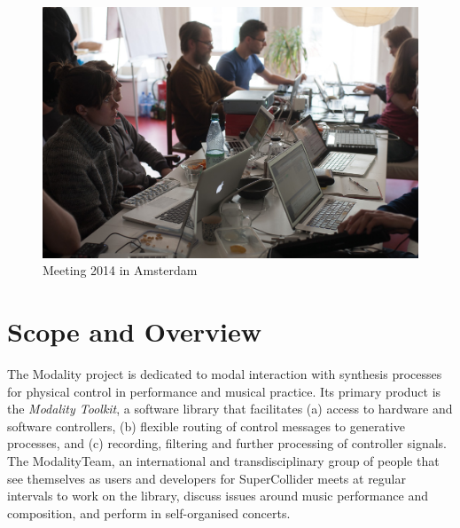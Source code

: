 \documentclass{article}
\title{\papertitle}
\begin{document}
%
\capstartfalse
\maketitle
\capstarttrue
%
\begin{abstract}
The Modality Toolkit aims to improve and facilitate the use of digital technology within interactive sound art and music. 
Written in SuperCollider, it simplifies the creation of individual electronic instruments by combining custom sound engines with off-the-shelf controllers. 
To this end, a common code interface, |MKtl|, is used to connect controllers from various sources and protocols. 
Currently, HID and MIDI are supported; GUI-based interfaces can be created on the fly from interface descriptions.
\end{abstract}

\begin{figure}[h]
	\centering
		\includegraphics[width=.9\columnwidth]{../media/20140331-IMG_5976.jpg}
	\caption{Meeting 2014 in Amsterdam}
	\label{fig:media_20140331-IMG_5976}
\end{figure}

\section{Scope and Overview}
\label{sec:overview_of_modality_concept_and_aims}

The Modality project is dedicated to modal interaction with synthesis processes for physical control in performance and musical practice.
Its primary product is the \emph{Modality Toolkit}, a software library that facilitates (a) access to hardware and software controllers, (b) flexible routing of control messages to generative processes, and (c) recording, filtering and further processing of controller signals.
The ModalityTeam, an international and transdisciplinary group of people that see themselves as users and developers for SuperCollider meets at regular intervals to work on the library, discuss issues around music performance and composition, and perform in self-organised concerts.
\end{document}
